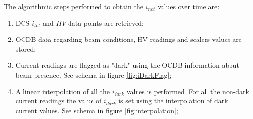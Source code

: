 
The algorithmic steps performed to obtain the $i_{net}$ values over time are:
\begin{enumerate}
\item DCS $i_{tot}$ and $HV$ data points are retrieved;
\item OCDB data regarding beam conditions, HV readings and scalers values are stored;
\item Current readings are flagged as "dark" using the OCDB information about beam presence. See schema in figure \ref{fig:iDarkFlag};
\item A linear interpolation of all the $i_{dark}$ values is performed. 
For all the non-dark current readings the value of $i_{dark}$ is set using the interpolation of dark current values. See schema in figure \ref{fig:interpolation};
\end{enumerate}

